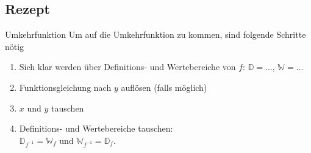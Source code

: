\subsection{Rezept}
\begin{rezept}{Umkehrfunktion}{}
  Um auf die Umkehrfunktion zu kommen, sind folgende Schritte nötig
  \begin{enumerate}
  \item Sich klar werden über Definitions- und Wertebereiche von $f$:
    $\mathbb{D} =  ...$, $\mathbb{W} = ...$
  \item Funktionsgleichung nach $y$ auf\/lösen (falls möglich)
  \item $x$ und $y$ tauschen
  \item Definitions- und Wertebereiche tauschen:\\
    $\mathbb{D}_{f^{-1}} = \mathbb{W}_f$ und  
    $\mathbb{W}_{f^{-1}} = \mathbb{D}_f$.
    \end{enumerate} 
  \end{rezept}
\newpage%
